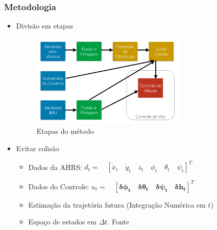 \documentclass{beamer}
\begin{document}
\begin{frame}[allowframebreaks]
	
	\frametitle{Metodologia}
	
	\begin{itemize}
		
		
	
		\item Divisão em etapas
		
		\begin{figure}[h]
			\centering
			\includegraphics[keepaspectratio = true,
			width=0.7\textwidth]{img/etapasMetodo.png}
			\caption{Etapas do método}
			\label{fig:etapasMetodo}
		\end{figure}
		
	\framebreak
	
	\item Evitar colisão
	
	\begin{itemize}
		
		\item Dados da AHRS: $d_{ t }=\quad { \left[ { \dot { x }  }_{ t }\quad { \dot { y }  }_{ t }\quad { \dot { z }  }_{ t }\quad { \phi  }_{ t }\quad { \theta  }_{ t }\quad { \psi  }_{ t } \right]  }^{ T }$
		
		\item Dados do Controle: ${ u }_{ t }=\quad { \left[ \mathbf{{ \delta \phi  }_{ t }\quad { \delta \theta  }_{ t }\quad { \delta \psi  }_{ t }\quad { \delta h }_{ t }} \right]  }^{ T }$	
			
	
	\item Estimação da trajetória futura (Integração Numérica em $t$)
	
		
		\item Espaço de estados em $\Delta t$. Fonte \cite{Basit2014}
		

\end{itemize}
\end{itemize}
\end{frame}
\end{document}
